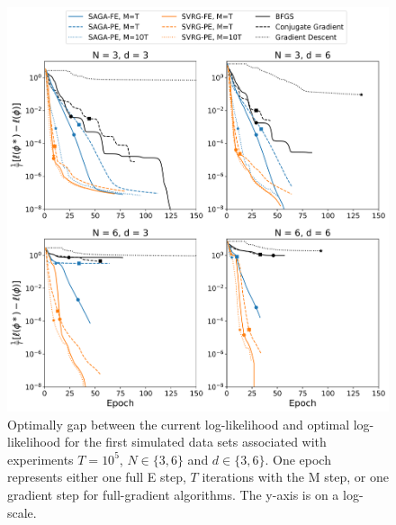\documentclass[12pt]{article}
\begin{document}
\begin{figure}[H]
    \centering
    \includegraphics[width=6.5in]{../plt/log-like_v_epoch_T-100000-000.png}
    \caption{Optimally gap between the current log-likelihood and optimal log-likelihood for the first simulated data sets associated with experiments $T=10^{5}$, $N \in \{3,6\}$ and $d \in \{3,6\}$. One epoch represents either one full E step, $T$ iterations with the M step, or one gradient step for full-gradient algorithms. The y-axis is on a log-scale.}
\end{figure}
%
\end{document}
